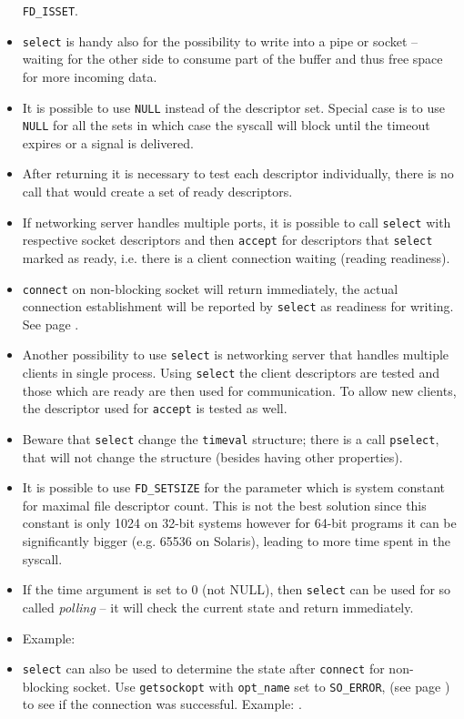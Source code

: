 \begin{itemize}
\texttt{FD\_ISSET}.
\item \texttt{select} is handy also for the possibility to write into a pipe or
socket -- waiting for the other side to consume part of the buffer and thus free
space for more incoming data.
\item It is possible to use \texttt{NULL} instead of the descriptor set. Special
case is to use \texttt{NULL} for all the sets in which case the syscall will
block until the timeout expires or a signal is delivered.
\item After returning it is necessary to test each descriptor individually,
there is no call that would create a set of ready descriptors.
\item If networking server handles multiple ports, it is possible to call
\texttt{select} with respective socket descriptors and then \texttt{accept}
for descriptors that \texttt{select} marked as ready, i.e. there is a client
connection waiting (reading readiness).
\item \texttt{connect} on non-blocking socket will return immediately, the
actual connection establishment will be reported by \texttt{select} as readiness
for writing. See page \pageref{CONNECT}.
\item Another possibility to use \texttt{select} is networking server that
handles multiple clients in single process. Using \texttt{select} the client
descriptors are tested and those which are ready are then used for
communication. To allow new clients, the descriptor used for \texttt{accept} is
tested as well.
\item Beware that \texttt{select}  change the \texttt{timeval}
structure; there is a call \texttt{pselect}, that will not change the structure
(besides having other properties).
\item It is possible to use \texttt{FD\_SETSIZE} for the 
parameter which is system constant for maximal file descriptor count. This is
not the best solution since this constant is only 1024 on 32-bit systems however
for 64-bit programs it can be significantly bigger (e.g. 65536 on Solaris),
leading to more time spent in the syscall.
\item If the time argument is set to 0 (not NULL), then \texttt{select} can be
used for so called \emph{polling} -- it will check the current state and return
immediately.
\item Example: \label{SELECT_C} 
\item \texttt{select} can also be used to determine the state after
\texttt{connect} for non-blocking socket. Use \texttt{getsockopt} with
\texttt{opt\_name} set to \texttt{SO\_ERROR}, (see page \pageref{GETSOCKOPT}) to
see if the connection was successful.
\label{NON_BLOCKING_CONNECT} Example: .


\end{itemize}

